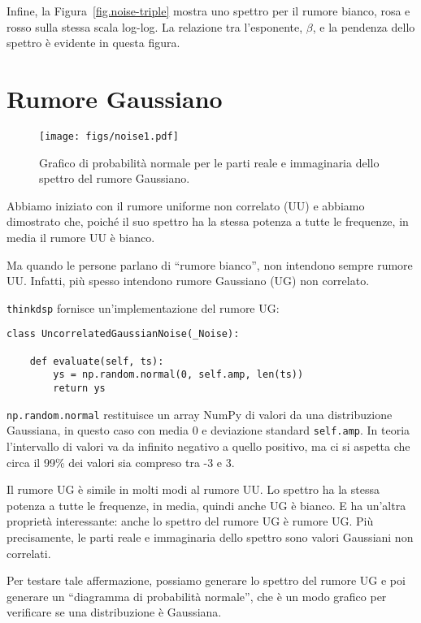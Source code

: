 \documentclass[12pt,a4paper]{book}
\begin{document}
Infine, la Figura~\ref{fig.noise-triple} mostra uno spettro per il rumore bianco, rosa e rosso sulla stessa scala log-log. La relazione tra l'esponente, $\beta$, e la pendenza dello spettro è evidente in questa figura.

\section{Rumore Gaussiano} 

\begin{figure} 

\centerline{\texttt{[image: figs/noise1.pdf]}} \caption{Grafico di probabilità normale per le parti reale e immaginaria dello spettro del rumore Gaussiano.} \label{fig.noise1} \end{figure} 

Abbiamo iniziato con il rumore uniforme non correlato (UU) e abbiamo dimostrato che, poiché il suo spettro ha la stessa potenza a tutte le frequenze, in media il rumore UU è bianco.

Ma quando le persone parlano di ``rumore bianco'', non intendono sempre rumore UU. Infatti, più spesso intendono rumore Gaussiano (UG) non correlato.

{\tt thinkdsp} fornisce un'implementazione del rumore UG:

\begin{verbatim} 
class UncorrelatedGaussianNoise(_Noise):

    def evaluate(self, ts):
        ys = np.random.normal(0, self.amp, len(ts))
        return ys
 \end{verbatim} 

{\tt np.random.normal} restituisce un array NumPy di valori da una distribuzione Gaussiana, in questo caso con media 0 e deviazione standard {\tt self.amp}. In teoria l'intervallo di valori va da infinito negativo a quello positivo, ma ci si aspetta che circa il 99\% dei valori sia compreso tra -3 e 3.

Il rumore UG è simile in molti modi al rumore UU. Lo spettro ha la stessa potenza a tutte le frequenze, in media, quindi anche UG è bianco. E ha un'altra proprietà interessante: anche lo spettro del rumore UG è rumore UG. Più precisamente, le parti reale e immaginaria dello spettro sono valori Gaussiani non correlati.

Per testare tale affermazione, possiamo generare lo spettro del rumore UG e poi generare un ``diagramma di probabilità normale'', che è un modo grafico per verificare se una distribuzione è Gaussiana.
\end{document}
